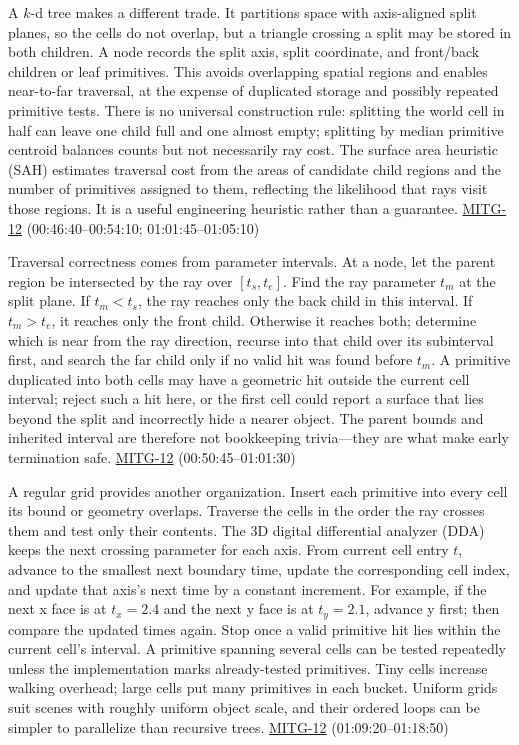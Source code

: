 A \(k\)-d tree makes a different trade. It partitions space with axis-aligned split planes, so the cells do not overlap, but a triangle crossing a split may be stored in both children. A node records the split axis, split coordinate, and front/back children or leaf primitives. This avoids overlapping spatial regions and enables near-to-far traversal, at the expense of duplicated storage and possibly repeated primitive tests. There is no universal construction rule: splitting the world cell in half can leave one child full and one almost empty; splitting by median primitive centroid balances counts but not necessarily ray cost. The surface area heuristic (SAH) estimates traversal cost from the areas of candidate child regions and the number of primitives assigned to them, reflecting the likelihood that rays visit those regions. It is a useful engineering heuristic rather than a guarantee. \hyperref[04-visual-computing-ii-ch036]{MITG-12} (00:46:40--00:54:10; 01:01:45--01:05:10)

Traversal correctness comes from parameter intervals. At a node, let the parent region be intersected by the ray over \([t_s,t_e]\). Find the ray parameter \(t_m\) at the split plane. If \(t_m<t_s\), the ray reaches only the back child in this interval. If \(t_m>t_e\), it reaches only the front child. Otherwise it reaches both; determine which is near from the ray direction, recurse into that child over its subinterval first, and search the far child only if no valid hit was found before \(t_m\). A primitive duplicated into both cells may have a geometric hit outside the current cell interval; reject such a hit here, or the first cell could report a surface that lies beyond the split and incorrectly hide a nearer object. The parent bounds and inherited interval are therefore not bookkeeping trivia---they are what make early termination safe. \hyperref[04-visual-computing-ii-ch036]{MITG-12} (00:50:45--01:01:30)

A regular grid provides another organization. Insert each primitive into every cell its bound or geometry overlaps. Traverse the cells in the order the ray crosses them and test only their contents. The 3D digital differential analyzer (DDA) keeps the next crossing parameter for each axis. From current cell entry \(t\), advance to the smallest next boundary time, update the corresponding cell index, and update that axis's next time by a constant increment. For example, if the next x face is at \(t_x=2.4\) and the next y face is at \(t_y=2.1\), advance y first; then compare the updated times again. Stop once a valid primitive hit lies within the current cell's interval. A primitive spanning several cells can be tested repeatedly unless the implementation marks already-tested primitives. Tiny cells increase walking overhead; large cells put many primitives in each bucket. Uniform grids suit scenes with roughly uniform object scale, and their ordered loops can be simpler to parallelize than recursive trees. \hyperref[04-visual-computing-ii-ch036]{MITG-12} (01:09:20--01:18:50)

